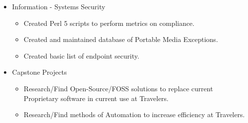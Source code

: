 \begin{cvparagraph}
\begin{itemize}
      \item Information - Systems Security
         \begin{itemize}
            \item Created Perl 5 scripts to perform metrics on compliance.
            \item Created and maintained database of Portable Media Exceptions.
            \item Created basic list of endpoint security.
         \end{itemize}

      \item[] \hspace{-0.4cm} Capstone Projects
         \begin{itemize}
            \item Research/Find Open-Source/FOSS solutions to replace current Proprietary
               software in current use at Travelers.
            \item Research/Find methods of Automation to increase efficiency at Travelers.
         \end{itemize}

   \end{itemize}

\end{cvparagraph}
